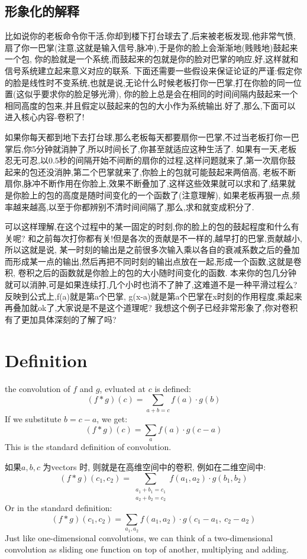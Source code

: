 \subsection{形象化的解释}
比如说你的老板命令你干活,你却到楼下打台球去了,后来被老板发现,他非常气愤,扇了你一巴掌(注意,这就是输入信号,脉冲),于是你的脸上会渐渐地(贱贱地)鼓起来一个包,
你的脸就是一个系统,而鼓起来的包就是你的脸对巴掌的响应,好,这样就和信号系统建立起来意义对应的联系.
下面还需要一些假设来保证论证的严谨:假定你的脸是线性时不变系统,也就是说,无论什么时候老板打你一巴掌,打在你脸的同一位置(这似乎要求你的脸足够光滑),
你的脸上总是会在相同的时间间隔内鼓起来一个相同高度的包来,并且假定以鼓起来的包的大小作为系统输出.好了,那么,下面可以进入核心内容-卷积了!

如果你每天都到地下去打台球,那么老板每天都要扇你一巴掌,不过当老板打你一巴掌后,你5分钟就消肿了,所以时间长了,你甚至就适应这种生活了.
如果有一天,老板忍无可忍,以$0.5$秒的间隔开始不间断的扇你的过程,这样问题就来了,第一次扇你鼓起来的包还没消肿,第二个巴掌就来了,你脸上的包就可能鼓起来两倍高,
老板不断扇你,脉冲不断作用在你脸上,效果不断叠加了,这样这些效果就可以求和了,结果就是你脸上的包的高度是随时间变化的一个函数了(注意理解),
如果老板再狠一点,频率越来越高,以至于你都辨别不清时间间隔了,那么,求和就变成积分了.

可以这样理解,在这个过程中的某一固定的时刻,你的脸上的包的鼓起程度和什么有关呢?
和之前每次打你都有关!但是各次的贡献是不一样的,越早打的巴掌,贡献越小,所以这就是说,
某一时刻的输出是之前很多次输入乘以各自的衰减系数之后的叠加而形成某一点的输出,然后再把不同时刻的输出点放在一起,形成一个函数,这就是卷积,
卷积之后的函数就是你脸上的包的大小随时间变化的函数.
本来你的包几分钟就可以消肿,可是如果连续打,几个小时也消不了肿了,这难道不是一种平滑过程么?
反映到公式上,f(a)就是第a个巴掌, g(x-a)就是第a个巴掌在x时刻的作用程度,乘起来再叠加就ok了,大家说是不是这个道理呢?
我想这个例子已经非常形象了,你对卷积有了更加具体深刻的了解了吗?

\section{Definition}
the convolution of $f$ and $g$, evluated at $c$ is defined:
$$(f\ast g)(c) = \sum_{a+b=c} f(a) \cdot g(b)$$
If we substitute $b = c − a$, we get:
$$(f\ast g)(c) = \sum_a f(a) \cdot g(c-a)$$
This is the standard definition of convolution.

如果$a, b, c$ 为vectors 时, 则就是在高维空间中的卷积, 例如在二维空间中:
$$(f\ast g)(c_1, c_2) = \sum_{\begin{array}{c}a_1+b_1=c_1\\a_2+b_2=c_2\end{array}} f(a_1,a_2) \cdot g(b_1,b_2)$$
Or in the standard definition:
$$(f\ast g)(c_1, c_2) = \sum_{a_1, a_2} f(a_1, a_2) \cdot g(c_1-a_1,~ c_2-a_2)$$
Just like one-dimensional convolutions, we can think of a two-dimensional convolution as sliding one function on top of another, multiplying and adding.

